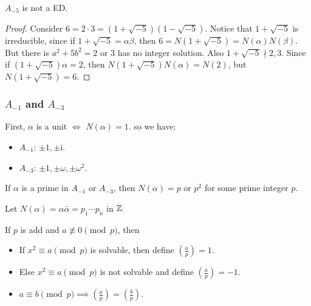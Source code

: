 \begin{example}
  $A_{-5}$ is not a ED.

  \begin{proof}
    Consider $6 = 2 \cdot 3 = (1 + \sqrt{-5})(1 - \sqrt{-5})$.
    Notice that $1 + \sqrt{-5}$ is irreducible, since if $1 + \sqrt{-5} = \alpha \beta$,
    then $6 = N(1 + \sqrt{-5}) = N(\alpha) N(\beta)$. But there is
    $a^2 + 5b^2 = 2 \text{ or } 3$ has no integer solution.
    Also $1 + \sqrt{-5} \nmid 2, 3$. Since if $(1 + \sqrt{-5}) \alpha = 2$,
    then $N(1 + \sqrt{-5}) N(\alpha) = N(2)$, but $N(1 + \sqrt{-5}) = 6$.
  \end{proof}
\end{example}

\subsubsection{$A_{-1}$ and $A_{-3}$}
First, $\alpha$ is a unit $\iff$ $N(\alpha) = 1$.
so we have:
\begin{itemize}
  \item $A_{-1}$: $\pm 1, \pm \mathrm{i}$.
  \item $A_{-3}$: $\pm 1, \pm \omega, \pm \omega^2$.
\end{itemize}

If $\alpha$ is a prime in $A_{-1}$ or $A_{-3}$, then $N(\alpha) = p \text{ or } p^2$ for some prime integer $p$.

Let $N(\alpha)  = \alpha \bar\alpha = p_1 \dotsm p_n$ in $\mathbb{Z}$

\begin{definition}
  If $p$ is add and $a \not\equiv 0 \pmod{p}$, then
  \begin{itemize}
    \item If $x^2 \equiv a \pmod{p}$ is solvable, then define $\left( \frac{a}{p} \right) = 1$.
    \item Else $x^2 \equiv a \pmod{p}$ is not solvable and define $\left( \frac{a}{p} \right) = -1$.
  \end{itemize}
\end{definition}

\begin{prop} \hfill
  \begin{itemize}
    \item $a \equiv b \pmod{p} \implies \left( \frac{a}{p} \right) = \left( \frac{b}{p} \right)$.
  \end{itemize}
\end{prop}

